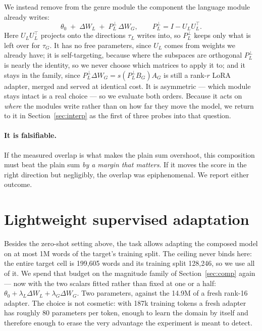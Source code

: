 \documentclass[10pt,twocolumn,a4paper]{article}
\begin{document}
We instead remove from the genre module the component the language module
already writes:
\begin{equation}
\theta_0 \;+\; \Delta W_L \;+\; P_L^{\perp}\,\Delta W_G ,
\qquad P_L^{\perp} = I - U_L U_L^{\top}.
\end{equation}
Here $U_LU_L^{\top}$ projects onto the directions $\tau_L$ writes into, so
$P_L^{\perp}$ keeps only what is left over for $\tau_G$.
It has no free parameters, since $U_L$ comes from weights we already have; it is
self-targeting, because where the subspaces are orthogonal $P_L^{\perp}$ is
nearly the identity, so we never choose which matrices to apply it to; and it
stays in the family, since $P_L^{\perp}\Delta W_G = s(P_L^{\perp}B_G)A_G$ is
still a rank-$r$ LoRA adapter, merged and served at identical cost. It is
asymmetric --- which module stays intact is a real choice --- so we evaluate
both orders. Because it acts on \emph{where} the modules write rather than on
how far they move the model, we return to it in
Section~\ref{sec:interp} as the first of three probes into that question.

\paragraph{It is falsifiable.} If the measured overlap is what makes the plain
sum overshoot, this composition must beat the plain sum \emph{by a margin that
matters}. If it moves the score in the right direction but negligibly, the
overlap was epiphenomenal. We report either outcome.

\section{Lightweight supervised adaptation}
\label{sec:sup}

Besides the zero-shot setting above, the task allows adapting the composed model
on at most 1M words of the target's training split. The ceiling never binds
here: the entire target cell is 199{,}605 words and its training split 128{,}246,
so we use all of it. We spend that budget on the
magnitude family of Section~\ref{sec:comp} again --- now with the two scalars
fitted rather than fixed at one or a half:
$\theta_0+\lambda_L\Delta W_L+\lambda_G\Delta W_G$. Two parameters,
against the 14.9M of a fresh rank-16 adapter. The choice is not cosmetic: with
187k training tokens a fresh adapter has roughly 80 parameters per token, enough
to learn the domain by itself and therefore enough to erase the very advantage
the experiment is meant to detect.
\end{document}
